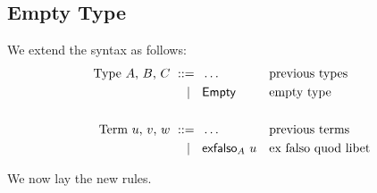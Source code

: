 \subsection{Empty Type}
\label{sec:empty-type}

We extend the syntax as follows:
%
\begin{align*}
  \text{Type $A$, $B$, $C$}
    \ \mathrel{{:}{:}{=}}\    {}& \ldots                   && \text{previous types}\\
    \ \mid\ \  {}& \mathsf{Empty}                   && \text{empty type} \\
  \\
  \text{Term $u$, $v$, $w$}
    \ \mathrel{{:}{:}{=}}\    {}& \ldots                   && \text{previous terms} \\
    \ \mid\ \  {}& \mathsf{exfalso}_{A}\  u         && \text{ex falso quod libet}
\end{align*}

We now lay the new rules.

\newcommand{\rlTyEmpty}{\referTo{ty-empty}{rul:ty-empty}}
\newcommand{\showTyEmpty}{%
  \infer[\rulename{ty-empty}] %
  {\isctx{\G}}
  {\istype{\G}{\Empty}}
}

\newcommand{\rlTermExfalso}{\referTo{term-exfalso}{rul:term-exfalso}}
\newcommand{\showTermExfalso}{%
  \infer[\rulename{term-exfalso}] %
  {\istype{\G}{\A} \\
   \isterm{\G}{\uu}{\Empty}
  }
  {\isterm{\G}{\exfalso{\A} \uu}{\A}}
}

\newcommand{\rlEqTySubstEmpty}{\referTo{eq-ty-subst-empty}{rul:eq-ty-subst-empty}}
\newcommand{\showEqTySubstEmpty}{%
  \infer[\rulename{eq-ty-subst-empty}] %
  {\issubst{\sbs}{\G}{\D}}
  {\eqtype{\G}{\subst{\Empty}{\sbs}}{\Empty}}
}

\newcommand{\rlEqSubstExfalso}{\referTo{eq-subst-exfalso}{rul:eq-subst-exfalso}}
\newcommand{\showEqSubstExfalso}{%
  \infer[\rulename{eq-subst-exfalso}] %
  {\issubst{\sbs}{\G}{\D} \\
   \istype{\D}{\A} \\
   \isterm{\D}{\uu}{\Empty}
  }
  {\eqterm{\G}
    {\subst{(\exfalso{\A} \uu)}{\sbs}}
    {\exfalso{\subst{\A}{\sbs}} \subst{\uu}{\sbs}}
    {\subst{\A}{\sbs}}
  }
}

\newcommand{\rlCongExfalso}{\referTo{cong-exfalso}{rul:cong-exfalso}}
\newcommand{\showCongExfalso}{%
  \infer[\rulename{cong-exfalso}] %
  {\eqtype{\G}{\A}{\B} \\
   \eqterm{\G}{\uu}{\vv}{\Empty}
  }
  {\eqterm{\G}
    {\exfalso{\A} \uu}
    {\exfalso{\B} \vv}
    {\A}
  }
}

